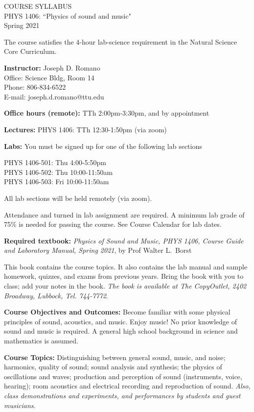 \documentclass[11pt]{NSF}
\begin{document}
\begin{center}
COURSE SYLLABUS\\
PHYS 1406: ``Physics of sound and music"\\
Spring 2021
\end{center}

The course satisfies the 4-hour lab-science requirement in the Natural Science Core Curriculum.

{\bf Instructor:}
Joseph D. Romano\\
Office: Science Bldg, Room 14\\
Phone: 806-834-6522\\
E-mail: joseph.d.romano@ttu.edu

{\bf Office hours (remote):}
TTh 2:00pm-3:30pm, and by appointment

{\bf Lectures:}
PHYS 1406: TTh 12:30-1:50pm (via zoom)

{\bf Labs:} You must be signed up for one of the following lab
sections

PHYS 1406-501: Thu 4:00-5:50pm\\
PHYS 1406-502: Thu 10:00-11:50am\\
PHYS 1406-503: Fri 10:00-11:50am

All lab sections will be held remotely (via zoom).

Attendance and turned in lab assignment are required.
A minimum lab grade of 75\% is needed for passing the course.
See Course Calendar for lab dates.

{\bf Required textbook:}
{\em Physics of Sound and Music, PHYS 1406, 
Course Guide and Laboratory Manual, Spring 2021}, by Prof Walter
L.~Borst

This book contains the course topics.
It also contains the lab manual and sample homework, quizzes, and exams
from previous years. 
Bring the book with you to class; add your notes in the book.
{\em The book is available at The CopyOutlet, 2402 Broadway, Lubbock,
Tel. 744-7772}.

{\bf Course Objectives and Outcomes:}
Become familiar with some physical principles of sound, acoustics, and music. 
Enjoy music!
No prior knowledge of sound and music is required. 
A general high school background in science and mathematics is assumed.

{\bf Course Topics:} 
Distinguishing between general sound, music, and noise;
harmonics, quality of sound; sound analysis and synthesis;
the physics of oscillations and waves;
production and perception of sound (instruments, voice, hearing);
room acoustics and electrical recording and reproduction of sound.
{\em Also, class demonstrations and experiments, and performances by 
students and guest musicians.}
\end{document}
